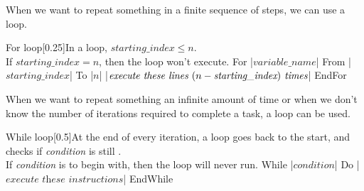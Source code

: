 \documentclass[12pt,a4paper,titlepage]{article}
\begin{document}
\begin{SummaryBox}[title=Concepts of pseudocode, breakable]
                \begin{SummaryExtensionBox}[title=For loops]
                    When we want to repeat something in a finite sequence of steps, we can use a  loop.
                    \begin{codeboxwithcomment}{For loop}[0.25\linewidth]{In a  loop, \( \textit{starting\_index} \leq n \).\vspace{0.65\baselineskip}\\If \( \textit{starting\_index} = n \), then the  loop won't execute.}
                        For |\( \textit{variable\_name} \)| From |\( \textit{starting\_index} \)| To |\( n \)|
                            |\( \textit{execute these lines } (n - \textit{starting\textunderscore{}index}) \textit{ times} \)|
                        EndFor
                    \end{codeboxwithcomment}
                \end{SummaryExtensionBox}
                
                \begin{SummaryExtensionBox}[title=While loops]
                    When we want to repeat something an infinite amount of time or when we don't know the number of iterations required to complete a task, a  loop can be used.
                    \begin{codeboxwithcomment}{While loop}[0.5\linewidth]{At the end of every iteration, a  loop goes back to the start, and checks if \textit{condition} is still .\vspace{0.65\baselineskip}\\If \textit{condition} is  to begin with, then the  loop will never run.}
                        While |\( \textit{condition} \)| Do
                            |\( \textit{execute these instructions} \)|
                        EndWhile
                    \end{codeboxwithcomment}
                \end{SummaryExtensionBox}
                

\end{SummaryBox}
\end{document}
